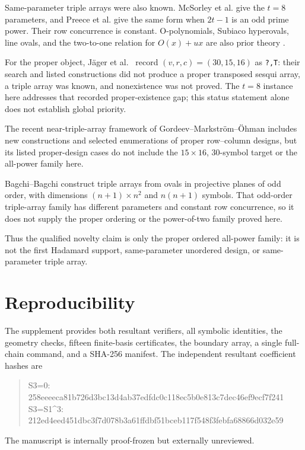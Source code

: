 \documentclass[11pt]{article}
\theoremstyle{definition}\newtheorem{definition}[theorem]{Definition}
\theoremstyle{remark}\newtheorem{remark}[theorem]{Remark}
\begin{document}
Same-parameter triple arrays were also known.  McSorley et al.
\cite{mcsorley} give the \(t=8\) parameters, and Preece et al.
\cite{preece} give the same form when \(2t-1\) is an odd prime power.  Their
row concurrence is constant.  O-polynomials, Subiaco hyperovals, line ovals,
and the two-to-one relation for \(O(x)+ux\) are also prior theory
\cite{flocks-ovals,kolsch,kolsch-correction,abdukhalikov}.

For the proper object, Jäger et al.\ \cite[Table~2]{jager} record
\((v,r,c)=(30,15,16)\) as \texttt{?,T}: their search and listed constructions
did not produce a proper transposed sesqui array, a triple array was known,
and nonexistence was not proved.  The \(t=8\) instance here addresses that
recorded proper-existence gap; this status statement alone does not establish
global priority.

The recent near-triple-array framework of Gordeev--Markstr\"om--Öhman
\cite{near-triple} includes new constructions and selected enumerations of
proper row--column designs, but its listed proper-design cases do not include
the \(15\times16\), 30-symbol target or the all-power family here.

Bagchi--Bagchi \cite{bagchi-ovals} construct triple arrays from ovals in
projective planes of odd order, with dimensions \((n+1)\times n^2\) and
\(n(n+1)\) symbols.  That odd-order triple-array family has different
parameters and constant row concurrence, so it does not supply the proper
ordering or the power-of-two family proved here.

Thus the qualified novelty claim is only the proper ordered all-power family:
it is not the first Hadamard support, same-parameter unordered design, or
same-parameter triple array.

\section{Reproducibility}
\label{sec:repro}
The supplement provides both resultant verifiers, all symbolic identities,
the geometry checks, fifteen finite-basis certificates, the boundary array,
a single full-chain command, and a SHA-256 manifest.  The independent
resultant coefficient hashes are
\begin{quote}
\ttfamily\small
S3=0: 258eeeeca81b726d3bc13d4ab37edfdc0c118ec5b0e813c7dec46ef9ecf7f241\\
S3=S1\textasciicircum3:
212ed4eed451dbc3f7d078b3a61ffdbf51bceb117f548f3febfa68866d032e59
\end{quote}
The manuscript is internally proof-frozen but externally unreviewed.
\end{document}
